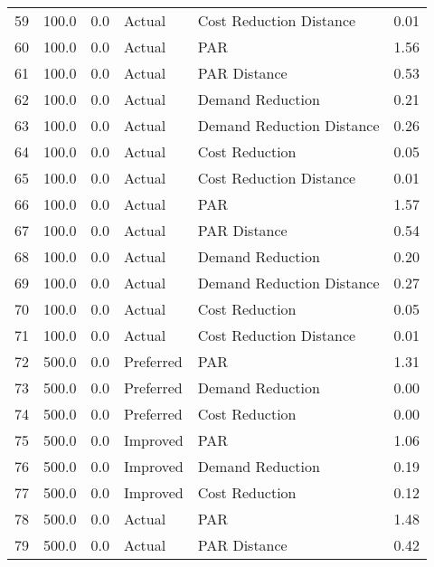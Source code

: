 \begin{longtable}{lrrllr}
59   &        100.0 &     0.0 &         Actual &    Cost Reduction Distance &   0.01 \\
60   &        100.0 &     0.0 &         Actual &                        PAR &   1.56 \\
61   &        100.0 &     0.0 &         Actual &               PAR Distance &   0.53 \\
62   &        100.0 &     0.0 &         Actual &           Demand Reduction &   0.21 \\
63   &        100.0 &     0.0 &         Actual &  Demand Reduction Distance &   0.26 \\
64   &        100.0 &     0.0 &         Actual &             Cost Reduction &   0.05 \\
65   &        100.0 &     0.0 &         Actual &    Cost Reduction Distance &   0.01 \\
66   &        100.0 &     0.0 &         Actual &                        PAR &   1.57 \\
67   &        100.0 &     0.0 &         Actual &               PAR Distance &   0.54 \\
68   &        100.0 &     0.0 &         Actual &           Demand Reduction &   0.20 \\
69   &        100.0 &     0.0 &         Actual &  Demand Reduction Distance &   0.27 \\
70   &        100.0 &     0.0 &         Actual &             Cost Reduction &   0.05 \\
71   &        100.0 &     0.0 &         Actual &    Cost Reduction Distance &   0.01 \\
72   &        500.0 &     0.0 &      Preferred &                        PAR &   1.31 \\
73   &        500.0 &     0.0 &      Preferred &           Demand Reduction &   0.00 \\
74   &        500.0 &     0.0 &      Preferred &             Cost Reduction &   0.00 \\
75   &        500.0 &     0.0 &       Improved &                        PAR &   1.06 \\
76   &        500.0 &     0.0 &       Improved &           Demand Reduction &   0.19 \\
77   &        500.0 &     0.0 &       Improved &             Cost Reduction &   0.12 \\
78   &        500.0 &     0.0 &         Actual &                        PAR &   1.48 \\
79   &        500.0 &     0.0 &         Actual &               PAR Distance &   0.42 \\

\end{longtable}
